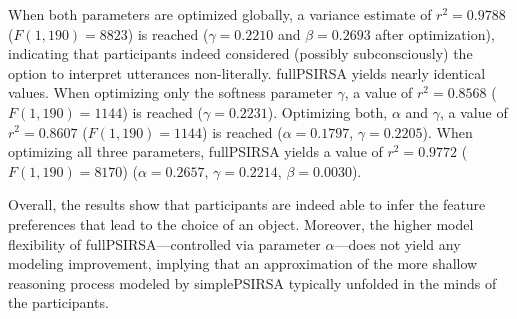 \documentclass[11pt,a4paper]{article}
\begin{document}
When both parameters are optimized globally, a variance estimate of $r^2 = 0.9788$ ($F(1,190) = 8823$) is reached
($\gamma=0.2210$ and $\beta=0.2693$ after optimization), indicating that participants indeed considered (possibly subconsciously) the option to interpret utterances non-literally. 
fullPSIRSA yields nearly identical values.
When optimizing only the softness parameter $\gamma$, a value of $r^2 = 0.8568$ ($F(1, 190) = 1144$) is reached ($\gamma=0.2231$).
Optimizing both, $\alpha$ and $\gamma$, a value of $r^2 = 0.8607$ ($F(1, 190) = 1144$) is reached ($\alpha=0.1797$, $\gamma=0.2205$).
When optimizing all three parameters, fullPSIRSA yields a value of $r^2 = 0.9772$ ($F(1, 190) = 8170$) ($\alpha=0.2657$, $\gamma=0.2214$, $\beta=0.0030$).

Overall, the results show that participants are indeed able to infer the feature preferences that lead to the choice of an object. %
Moreover, the higher model flexibility of fullPSIRSA---controlled via parameter $\alpha$---does not yield any modeling improvement, implying that an approximation of the more shallow reasoning process modeled by simplePSIRSA typically unfolded in the minds of the participants.  

\end{document}
